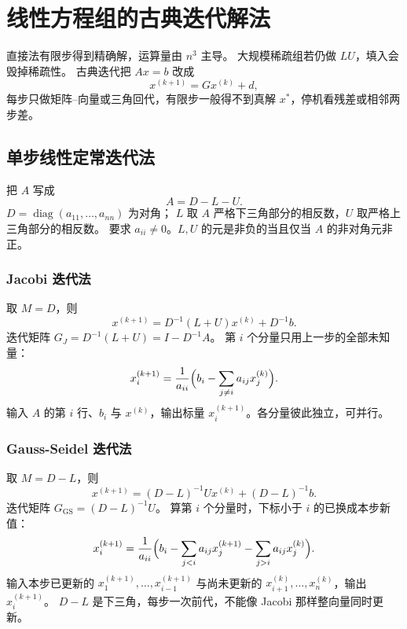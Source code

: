 \chapter{线性方程组的古典迭代解法}

直接法有限步得到精确解，运算量由 \(n^3\) 主导。
大规模稀疏组若仍做 \(LU\)，填入会毁掉稀疏性。
古典迭代把 \(Ax=b\) 改成
\[
x^{(k+1)}=Gx^{(k)}+d,
\]
每步只做矩阵–向量或三角回代，有限步一般得不到真解 \(x^{*}\)，停机看残差或相邻两步差。

\section{单步线性定常迭代法}

把 \(A\) 写成
\begin{equation}
A=D-L-U.
\end{equation}
\(D=\operatorname{diag}(a_{11},\ldots,a_{nn})\) 为对角；
\(L\) 取 \(A\) 严格下三角部分的相反数，\(U\) 取严格上三角部分的相反数。
要求 \(a_{ii}\neq 0\)。\(L,U\) 的元是非负的当且仅当 \(A\) 的非对角元非正。

\subsection{Jacobi 迭代法}

取 \(M=D\)，则
\begin{equation}
x^{(k+1)}=D^{-1}(L+U)x^{(k)}+D^{-1}b.
\end{equation}
迭代矩阵 \(G_J=D^{-1}(L+U)=I-D^{-1}A\)。
第 \(i\) 个分量只用上一步的全部未知量：
\begin{equation}
x_i^{(k+1)}=\frac{1}{a_{ii}}\Bigl(b_i-\sum_{j\neq i}a_{ij}x_j^{(k)}\Bigr).
\end{equation}
输入 \(A\) 的第 \(i\) 行、\(b_i\) 与 \(x^{(k)}\)，输出标量 \(x_i^{(k+1)}\)。各分量彼此独立，可并行。

\subsection{Gauss-Seidel 迭代法}

取 \(M=D-L\)，则
\begin{equation}
x^{(k+1)}=(D-L)^{-1}Ux^{(k)}+(D-L)^{-1}b.
\end{equation}
迭代矩阵 \(G_{\mathrm{GS}}=(D-L)^{-1}U\)。
算第 \(i\) 个分量时，下标小于 \(i\) 的已换成本步新值：
\begin{equation}
x_i^{(k+1)}=\frac{1}{a_{ii}}\Bigl(b_i-\sum_{j<i}a_{ij}x_j^{(k+1)}-\sum_{j>i}a_{ij}x_j^{(k)}\Bigr).
\end{equation}
输入本步已更新的 \(x_1^{(k+1)},\ldots,x_{i-1}^{(k+1)}\) 与尚未更新的 \(x_{i+1}^{(k)},\ldots,x_n^{(k)}\)，输出 \(x_i^{(k+1)}\)。
\(D-L\) 是下三角，每步一次前代，不能像 Jacobi 那样整向量同时更新。

